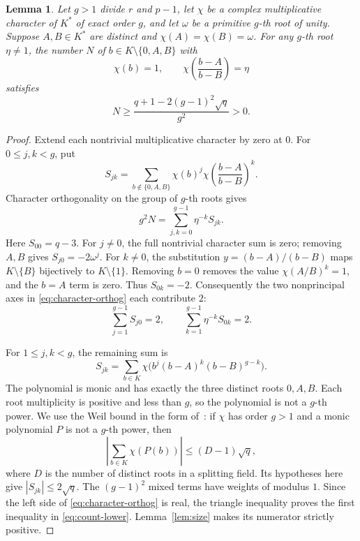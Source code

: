 \documentclass[11pt]{article}
\newtheorem{lemma}[theorem]{Lemma}
\theoremstyle{definition}
\theoremstyle{remark}
\numberwithin{equation}{section}
\begin{document}
\begin{lemma}\label{lem:character-count}
Let \(g>1\) divide \(r\) and \(p-1\), let \(\chi\) be a complex
multiplicative character of \(K^*\) of exact order \(g\), and let
\(\omega\) be a primitive \(g\)-th root of unity.
Suppose \(A,B\in K^*\) are distinct and
\(\chi(A)=\chi(B)=\omega\). For any \(g\)-th root
\(\eta\ne1\), the number \(N\) of \(b\in K\setminus\{0,A,B\}\) with
\begin{equation}\label{eq:count-conditions}
 \chi(b)=1,\qquad
 \chi\left(\frac{b-A}{b-B}\right)=\eta
\end{equation}
satisfies
\begin{equation}\label{eq:count-lower}
 N\ge\frac{q+1-2(g-1)^2\sqrt q}{g^2}>0.
\end{equation}
\end{lemma}
\begin{proof}
Extend each nontrivial multiplicative character by zero at \(0\).
For \(0\le j,k<g\), put
\[
 S_{jk}=\sum_{b\notin\{0,A,B\}}
          \chi(b)^j\chi\left(\frac{b-A}{b-B}\right)^k.
\]
Character orthogonality on the group of \(g\)-th roots gives
\begin{equation}\label{eq:character-orthog}
 g^2N=\sum_{j,k=0}^{g-1}\eta^{-k}S_{jk}.
\end{equation}
Here \(S_{00}=q-3\). For \(j\ne0\), the full nontrivial character
sum is zero; removing \(A,B\) gives
\(S_{j0}=-2\omega^j\).
For \(k\ne0\), the substitution \(y=(b-A)/(b-B)\) maps
\(K\setminus\{B\}\) bijectively to \(K\setminus\{1\}\).
Removing \(b=0\) removes the value
\(\chi(A/B)^k=1\), and the \(b=A\) term is zero.
Thus \(S_{0k}=-2\). Consequently the two nonprincipal axes in
\eqref{eq:character-orthog} each contribute \(2\):
\[
 \sum_{j=1}^{g-1}S_{j0}=2,\qquad
 \sum_{k=1}^{g-1}\eta^{-k}S_{0k}=2.
\]

For \(1\le j,k<g\), the remaining sum is
\[
 S_{jk}=\sum_{b\in K}
       \chi\bigl(b^j(b-A)^k(b-B)^{g-k}\bigr).
\]
The polynomial is monic and has exactly the three distinct roots
\(0,A,B\). Each root multiplicity is positive and less than \(g\),
so the polynomial is not a \(g\)-th power.
We use the Weil bound in the form
of~\cite[Theorem~2.1]{AGW}: if \(\chi\) has order \(g>1\) and a
monic polynomial \(P\) is not a \(g\)-th power, then
\[
 \left|\sum_{b\in K}\chi(P(b))\right|
       \le (D-1)\sqrt q,
\]
where \(D\) is the number of distinct roots in a splitting field.
Its hypotheses here give \(|S_{jk}|\le2\sqrt q\).
The \((g-1)^2\) mixed terms have weights of modulus \(1\).
Since the left side of \eqref{eq:character-orthog} is real,
the triangle inequality proves the first inequality in
\eqref{eq:count-lower}. Lemma~\ref{lem:size} makes its numerator
strictly positive.
\end{proof}
\end{document}
